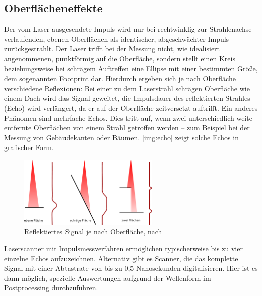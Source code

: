 \documentclass[a4paper,12pt,bibliography=totoc, listof=totoc,titlepage,pointlessnumbers]{scrreprt}
\begin{document}
\subsection{Oberflächeneffekte}
Der vom Laser ausgesendete Impuls wird nur bei rechtwinklig zur Strahlenachse verlaufenden, ebenen Oberflächen als identischer, abgeschwächter Impuls zurückgestrahlt. Der Laser trifft bei der Messung nicht, wie idealisiert angenommenen, punktförmig auf die Oberfläche, sondern stellt einen Kreis beziehungsweise bei schrägem Auftreffen eine Ellipse mit einer bestimmten Größe, dem sogenannten Footprint dar. Hierdurch ergeben sich je nach Oberfläche verschiedene Reflexionen: Bei einer zu dem Laserstrahl schrägen Oberfläche wie einem Dach wird das Signal geweitet, die Impulsdauer des reflektierten Strahles (Echo) wird verlängert, da er auf der Oberfläche zeitversetzt auftrifft. Ein anderes Phänomen sind mehrfache Echos. Dies tritt auf, wenn zwei unterschiedlich weite entfernte Oberflächen von einem Strahl getroffen werden -- zum Beispiel bei der Messung von Gebäudekanten oder Bäumen. \autoref{img:echo} zeigt solche Echos in grafischer Form. \citep[S. 28]{beraldin}

\begin{figure}[!ht]
 \centering
 \includegraphics[width=0.6\textwidth]{./img/echo.pdf}
 \caption{Reflektiertes Signal je nach Oberfläche, nach \citet[S. 28]{beraldin}}
 \label{img:echo}
\end{figure}

Laser\-scan\-ner mit Impulsmessverfahren ermöglichen typischerweise bis zu vier einzelne Echos aufzuzeichnen. Alternativ gibt es Scanner, die das komplette Signal mit einer Abtastrate von bis zu 0,5 Nanosekunden digitalisieren. Hier ist es dann möglich, spezielle Auswertungen aufgrund der Wellenform im Postprocessing durchzuführen. \citep[S. 29]{beraldin}
\end{document}
